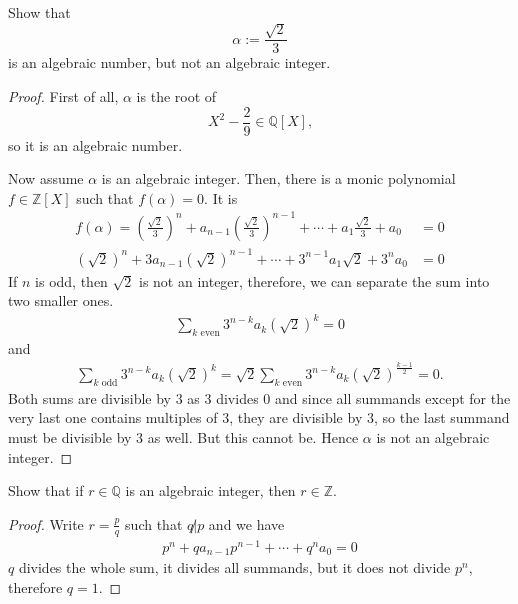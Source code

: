 \begin{example}
    Show that
    \begin{equation*}
        \alpha := \frac{\sqrt{2}}{3}
    \end{equation*}
    is an algebraic number, but not an algebraic integer.
\end{example}
\begin{proof}
    First of all, \(\alpha\) is the root of
    \begin{equation*}
        X^2 - \frac{2}{9} \in \mathbb{Q}[X] \text{,}
    \end{equation*}
    so it is an algebraic number.

    Now assume \(\alpha\) is an algebraic integer. Then, there is a monic polynomial \(f \in \mathbb{Z}[X]\) such that \(f(\alpha) = 0\). It is
    \begin{align*}
        f(\alpha) = \left(\frac{\sqrt{2}}{3}\right)^n + a_{n-1}\left(\frac{\sqrt{2}}{3}\right)^{n - 1} + \cdots + a_1 \frac{\sqrt{2}}{3} + a_0 &= 0 \\
        (\sqrt{2})^n + 3 a_{n-1} (\sqrt{2})^{n-1} + \cdots + 3^{n-1} a_1 \sqrt{2} + 3^n a_0 &= 0
    \end{align*}
    If \(n\) is odd, then \(\sqrt{2}\) is not an integer, therefore, we can separate the sum into two smaller ones.
    \begin{align*}
        \sum_{k \text{ even}} 3^{n - k} a_k (\sqrt{2})^k = 0
    \end{align*}
    and
    \begin{align*}
        \sum_{k \text{ odd}} 3^{n - k} a_k (\sqrt{2})^k = \sqrt{2} \sum_{k \text{ even}} 3^{n - k} a_k (\sqrt{2})^{\frac{k - 1}{2}} = 0\text{.}
    \end{align*}
    Both sums are divisible by \(3\) as \(3\) divides \(0\) and since all summands except for the very last one contains multiples of \(3\), they are divisible by \(3\), so the last summand must be divisible by \(3\) as well. But this cannot be. Hence \(\alpha\) is not an algebraic integer.
\end{proof}

\begin{example}
    Show that if \(r \in \mathbb{Q}\) is an algebraic integer, then \(r \in \mathbb{Z}\).
\end{example}
\begin{proof}
    Write \(r = \frac{p}{q}\) such that \(q \not| p\) and we have
    \begin{align*}
        p^n + q a_{n-1}p^{n-1} + \cdots + q^n a_0 = 0
    \end{align*}
    \(q\) divides the whole sum, it divides all summands, but it does not divide \(p^n\), therefore \(q = 1\).
\end{proof}

